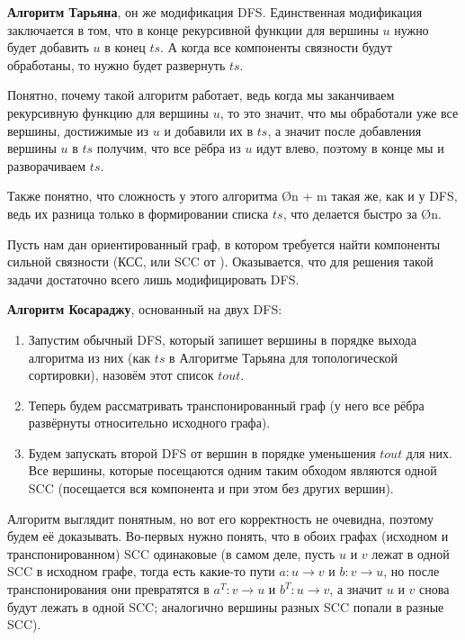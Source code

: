 \textbf{Алгоритм Тарьяна}, он же модификация DFS. Единственная модификация заключается в том, что в конце рекурсивной функции для вершины $u$ нужно будет добавить $u$ в конец $ts$. А когда все компоненты связности будут обработаны, то нужно будет развернуть $ts$.

Понятно, почему такой алгоритм работает, ведь когда мы заканчиваем рекурсивную функцию для вершины $u$, то это значит, что мы обработали уже все вершины, достижимые из $u$ и добавили их в $ts$, а значит после добавления вершины $u$ в $ts$ получим, что все рёбра из $u$ идут влево, поэтому в конце мы и разворачиваем $ts$.

Также понятно, что сложность у этого алгоритма \O{n + m} такая же, как и у DFS, ведь их разница только в формировании списка $ts$, что делается быстро за \O{n}.


Пусть нам дан ориентированный граф, в котором требуется найти компоненты сильной связности (КСС, или SCC от ). Оказывается, что для решения такой задачи достаточно всего лишь модифицировать DFS.

\textbf{Алгоритм Косараджу}, основанный на двух DFS:

\begin{box-algo}
    \begin{enumerate}
        \item Запустим обычный DFS, который запишет вершины в порядке выхода алгоритма из них (как $ts$ в Алгоритме Тарьяна для топологической сортировки), назовём этот список $tout$.
        \item Теперь будем рассматривать транспонированный граф (у него все рёбра развёрнуты относительно исходного графа).
        \item Будем запускать второй DFS от вершин в порядке уменьшения $tout$ для них. Все вершины, которые посещаются одним таким обходом являются одной SCC (посещается вся компонента и при этом без других вершин).
    \end{enumerate}
\end{box-algo}

Алгоритм выглядит понятным, но вот его корректность не очевидна, поэтому будем её доказывать. Во-первых нужно понять, что в обоих графах (исходном и транспонированном) SCC одинаковые (в самом деле, пусть $u$ и $v$ лежат в одной SCC в исходном графе, тогда есть какие-то пути $a: u \to v$ и $b: v \to u$, но после транспонирования они превратятся в $a^T: v \to u$ и $b^T: u \to v$, а значит $u$ и $v$ снова будут лежать в одной SCC; аналогично вершины разных SCC попали в разные SCC).


